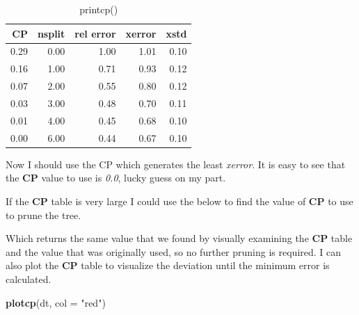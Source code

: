 \documentclass[]{article}
\newenvironment{Shaded}{\begin{snugshade}}{\end{snugshade}}
\newcommand{\KeywordTok}[1]{\textcolor[rgb]{0.13,0.29,0.53}{\textbf{#1}}}
\newcommand{\DataTypeTok}[1]{\textcolor[rgb]{0.13,0.29,0.53}{#1}}
\newcommand{\DecValTok}[1]{\textcolor[rgb]{0.00,0.00,0.81}{#1}}
\newcommand{\StringTok}[1]{\textcolor[rgb]{0.31,0.60,0.02}{#1}}
\newcommand{\OperatorTok}[1]{\textcolor[rgb]{0.81,0.36,0.00}{\textbf{#1}}}
\newcommand{\NormalTok}[1]{#1}
\renewcommand{\&}{and}
\begin{document}
\begin{table}[htb]
\centering
\caption{ printcp()}
\vspace{0.2cm}
\begin{tabular}{rrrrr}
  \hline
CP & nsplit & rel error & xerror & xstd \\ 
  \hline
0.29 & 0.00 & 1.00 & 1.01 & 0.10 \\ 
  0.16 & 1.00 & 0.71 & 0.93 & 0.12 \\ 
  0.07 & 2.00 & 0.55 & 0.80 & 0.12 \\ 
  0.03 & 3.00 & 0.48 & 0.70 & 0.11 \\ 
  0.01 & 4.00 & 0.45 & 0.68 & 0.10 \\ 
  0.00 & 6.00 & 0.44 & 0.67 & 0.10 \\ 
   \hline
\end{tabular}
\end{table}

Now I should use the CP which generates the least \emph{xerror}. It is
easy to see that the \textbf{CP} value to use is \emph{0.0}, lucky guess
on my part.

If the \textbf{CP} table is very large I could use the below to find the
value of \textbf{CP} to use to prune the tree.

\begin{Shaded}
\end{Shaded}

Which returns the same value that we found by visually examining the
\textbf{CP} table and the value that was originally used, so no further
pruning is required. I can also plot the \textbf{CP} table to visualize
the deviation until the minimum error is calculated.

\begin{Shaded}
\begin{Highlighting}[]
\KeywordTok{plotcp}\NormalTok{(dt, }\DataTypeTok{col =} \StringTok{"red"}\NormalTok{)}
\end{Highlighting}
\end{Shaded}
\end{document}
